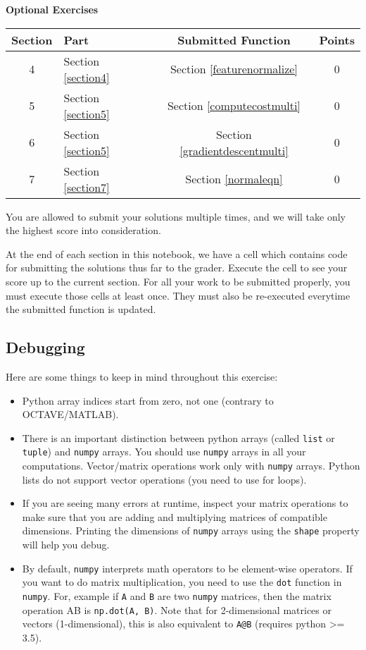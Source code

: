 \documentclass[11pt]{article}
\begin{document}
\textbf{Optional Exercises}

\begin{longtable}[]{@{}clcc@{}}
\toprule
Section & Part & Submitted Function & Points\tabularnewline
\midrule
\endhead
4 & Section \ref{section4} & Section \ref{featurenormalize} &
0\tabularnewline
5 & Section \ref{section5} & Section \ref{computecostmulti} &
0\tabularnewline
6 & Section \ref{section5} & Section \ref{gradientdescentmulti} &
0\tabularnewline
7 & Section \ref{section7} & Section \ref{normaleqn} & 0\tabularnewline
\bottomrule
\end{longtable}

You are allowed to submit your solutions multiple times, and we will
take only the highest score into consideration.

At the end of each section in this notebook, we have a cell which
contains code for submitting the solutions thus far to the grader.
Execute the cell to see your score up to the current section. For all
your work to be submitted properly, you must execute those cells at
least once. They must also be re-executed everytime the submitted
function is updated.

\subsection{Debugging}\label{debugging}

Here are some things to keep in mind throughout this exercise:

\begin{itemize}
\item
  Python array indices start from zero, not one (contrary to
  OCTAVE/MATLAB).
\item
  There is an important distinction between python arrays (called
  \texttt{list} or \texttt{tuple}) and \texttt{numpy} arrays. You should
  use \texttt{numpy} arrays in all your computations. Vector/matrix
  operations work only with \texttt{numpy} arrays. Python lists do not
  support vector operations (you need to use for loops).
\item
  If you are seeing many errors at runtime, inspect your matrix
  operations to make sure that you are adding and multiplying matrices
  of compatible dimensions. Printing the dimensions of \texttt{numpy}
  arrays using the \texttt{shape} property will help you debug.
\item
  By default, \texttt{numpy} interprets math operators to be
  element-wise operators. If you want to do matrix multiplication, you
  need to use the \texttt{dot} function in \texttt{numpy}. For, example
  if \texttt{A} and \texttt{B} are two \texttt{numpy} matrices, then the
  matrix operation AB is \texttt{np.dot(A,\ B)}. Note that for
  2-dimensional matrices or vectors (1-dimensional), this is also
  equivalent to \texttt{A@B} (requires python \textgreater{}= 3.5).
\end{itemize}
\end{document}
